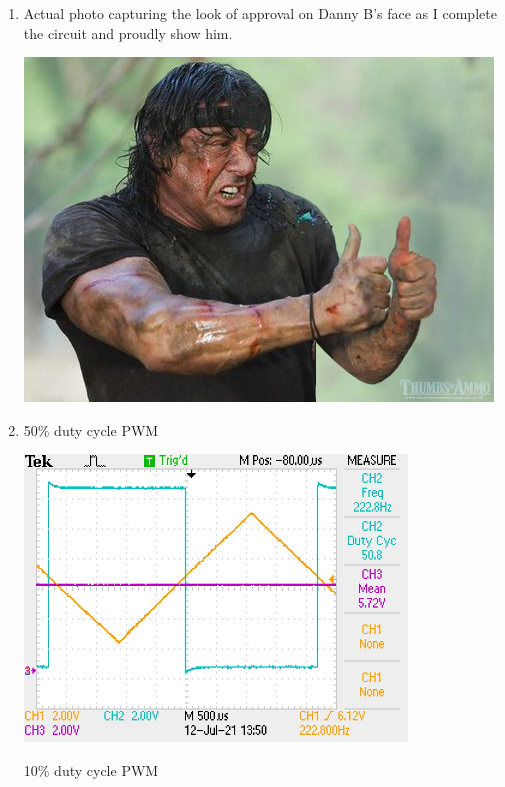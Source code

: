 \documentclass[a4paper,11pt]{article}
\begin{document}
\begin{preview}
\begin{enumerate}
    \item 
    Actual photo capturing the look of approval on Danny B's face as I complete the circuit and proudly show him.
    \begin{center}
        \includegraphics[width = \textwidth]{Danny_B.jpg}
    \end{center}
    \vspace{20pt}

    \item 
    50\% duty cycle PWM
    \begin{center}
        \includegraphics[width = 0.8\textwidth]{50_duty.JPG}
    \end{center}
    \vspace{10pt}

    10\% duty cycle PWM
    

\end{enumerate}
\end{preview}
\end{document}

